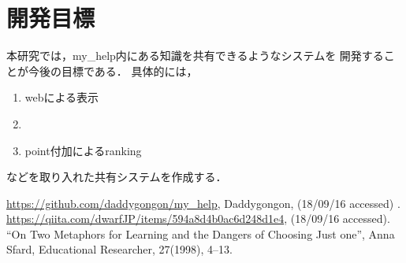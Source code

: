 \documentclass[a4j,twocolumn,uplatex]{jsarticle}
\begin{document}
\section{開発目標}
本研究では，my\_help内にある知識を共有できるようなシステムを
開発することが今後の目標である．
具体的には，
\begin{enumerate}
\item webによる表示
\item 
\item point付加によるranking
\end{enumerate}
などを取り入れた共有システムを作成する．

{\small\setlength\baselineskip{10pt}	%
\begin{thebibliography}{9}
\url{https://github.com/daddygongon/my_help}, Daddygongon, (18/09/16 accessed) .
 \url{https://qiita.com/dwarfJP/items/594a8d4b0ac6d248d1e4}, (18/09/16 accessed).
“On Two Metaphors for Learning and the Dangers of Choosing Just one”, Anna
Sfard, Educational Researcher, 27(1998), 4–13.
\end{thebibliography}
}
\end{document}
